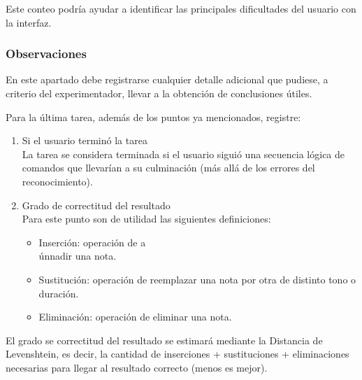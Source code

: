 Este conteo podr\'ia ayudar a identificar las principales dificultades del usuario con la interfaz.

\subsubsection{Observaciones}

En este apartado debe registrarse cualquier detalle adicional que pudiese, a criterio del experimentador, llevar a la obtenci\'on de conclusiones \'utiles.

Para la \'ultima tarea, adem\'as de los puntos ya mencionados, registre:
\begin{enumerate}
    \item Si el usuario termin\'o la tarea \\
    La tarea se considera terminada si el usuario sigui\'o una secuencia l\'ogica de comandos que llevar\'ian a su culminaci\'on (m\'as all\'a de los errores del reconocimiento).
    \item Grado de correctitud del resultado \\
    Para este punto son de utilidad las siguientes definiciones:
    \begin{itemize}
        \item Inserci\'on: operaci\'on de a\\\'unnadir una nota.
        \item Sustituci\'on: operaci\'on de reemplazar una nota por otra de distinto tono o duraci\'on.
        \item Eliminaci\'on: operaci\'on de eliminar una nota.
    \end{itemize}
\end{enumerate}

El grado se correctitud del resultado se estimar\'a mediante la Distancia de Levenshtein, es decir, la cantidad de inserciones + sustituciones + eliminaciones necesarias para llegar al resultado correcto (menos es mejor).

